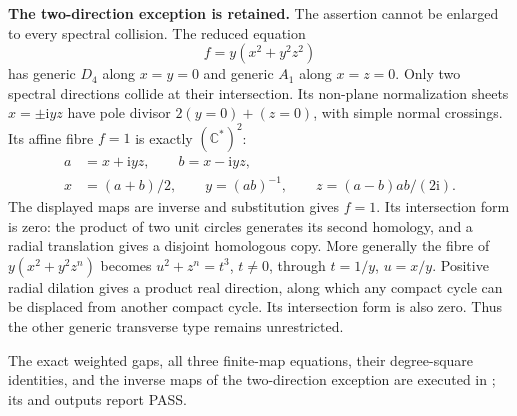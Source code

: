 \par\medskip\noindent\textbf{The two-direction exception is retained.}
The assertion cannot be enlarged to every spectral
collision. The reduced equation
\[
                       f=y(x^2+y^2z^2)
\]
has generic $D_4$ along $x=y=0$ and generic $A_1$
along $x=z=0$. Only two spectral directions collide
at their intersection. Its non-plane normalization
sheets $x=\pm\mathrm i yz$ have pole divisor
$2(y=0)+(z=0)$, with simple normal crossings.
Its affine fibre $f=1$ is exactly $(\mathbb C^*)^2$:
\[
 \begin{split}
       a&=x+\mathrm i yz,\qquad b=x-\mathrm i yz,\\
       x&=(a+b)/2,\qquad y=(ab)^{-1},\qquad
       z=(a-b)ab/(2\mathrm i).
 \end{split}
\]
The displayed maps are inverse and substitution gives
$f=1$. Its intersection form is zero: the product
of two unit circles generates its second homology,
and a radial translation gives a disjoint homologous
copy. More generally the fibre of $y(x^2+y^2z^n)$
becomes $u^2+z^n=t^3$, $t\ne0$, through
$t=1/y$, $u=x/y$. Positive radial dilation gives
a product real direction, along which any compact
cycle can be displaced from another compact cycle.
Its intersection form is also zero. Thus the
other generic transverse type remains unrestricted.

The exact weighted gaps, all three finite-map
equations, their degree-square identities, and the
inverse maps of the two-direction exception are
executed in ;
its  and  outputs report PASS.
